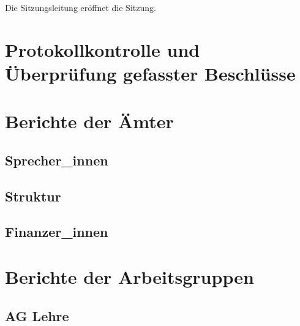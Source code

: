 \documentclass{fsrprotokoll}
\begin{document}

\date{}  %
\attendeesNumber{}  %
\chairperson{}
\clerks{}
\meetingStart{}  %
\meetingEnd{}  %
\attendees{}
\excused{}
\unexcused{}
\resting{}

\maketitle

Die Sitzungsleitung eröffnet die Sitzung.

\quorum{}{} %

\section{Protokollkontrolle und Überprüfung gefasster Beschlüsse}

\section{Berichte der Ämter}
\subsection{Sprecher\_innen}

\subsection{Struktur}

\subsection{Finanzer\_innen}

\section{Berichte der Arbeitsgruppen}

\subsection{AG Lehre}
\end{document}
